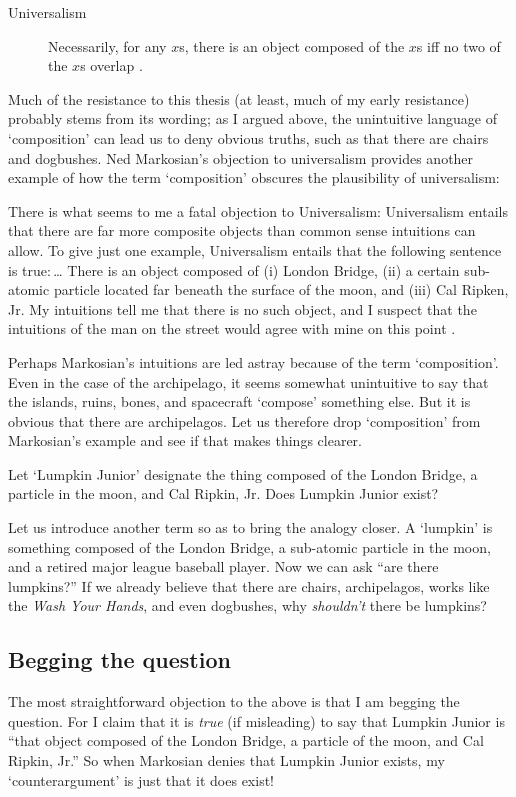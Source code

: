 \documentclass[11pt]{article}
\newenvironment{squote}{%
\begin{spacing}{1}
       	\begin{list}{}{%
\setlength{\labelwidth}{0pt}%
\rightmargin\leftmargin%
}
\item\relax
}{%
\end{list}%
\end{spacing}
}
\begin{document}
\begin{spacing}{1.25}
\begin{description}
\item[Universalism] Necessarily, for any $x$s, there is an object
  composed of the $x$s iff no two of the $x$s overlap
  \citep[227]{markosian1998a}.
\end{description}

Much of the resistance to this thesis (at least, much of my early
resistance) probably stems from its wording; as I argued above, the
unintuitive language of `composition' can lead us to deny obvious
truths, such as that there are chairs and dogbushes.  Ned Markosian's
objection to universalism provides another example of how the term
`composition' obscures the plausibility of universalism:

\begin{squote}
There is what seems to me a fatal objection to Universalism:
Universalism entails that there are far more composite objects than
common sense intuitions can allow.  To give just one example,
Universalism entails that the following sentence is true:\,\ldots
There is an object composed of (i) London Bridge, (ii) a certain
sub-atomic particle located far beneath the surface of the moon, and
(iii) Cal Ripken, Jr.  My intuitions tell me that there is no such
object, and I suspect that the intuitions of the man on the street
would agree with mine on this point \citeyearpar[228]{markosian1998a}.
\end{squote}

Perhaps Markosian's intuitions are led astray because of the term
`composition'.  Even in the case of the archipelago, it seems somewhat
unintuitive to say that the islands, ruins, bones, and spacecraft
`compose' something else.  But it is obvious that there are
archipelagos.  Let us therefore drop `composition' from Markosian's
example and see if that makes things clearer.

Let `Lumpkin Junior' designate the thing composed of the London
Bridge, a particle in the moon, and Cal Ripkin, Jr.  Does Lumpkin
Junior exist?

Let us introduce another term so as to bring the analogy closer.  A
`lumpkin' is something composed of the London Bridge, a sub-atomic
particle in the moon, and a retired major league baseball player.  Now
we can ask ``are there lumpkins?''  If we already believe that there
are chairs, archipelagos, works like the {\em Wash Your Hands}, and
even dogbushes, why {\em shouldn't} there be lumpkins?

\subsection{Begging the question}
\label{beg}
The most straightforward objection to the above is that I am begging
the question.  For I claim that it is {\em true} (if misleading) to
say that Lumpkin Junior is ``that object composed of the London
Bridge, a particle of the moon, and Cal Ripkin, Jr.''  So when
Markosian denies that Lumpkin Junior exists, my `counterargument' is
just that it does exist!


\end{spacing}
\end{document}
